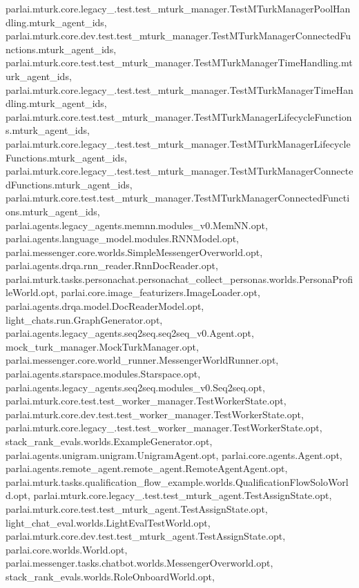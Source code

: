 parlai.\+mturk.\+core.\+legacy\+\_.\+test.\+test\+\_\+mturk\+\_\+manager.\+Test\+M\+Turk\+Manager\+Pool\+Handling.\+mturk\+\_\+agent\+\_\+ids, parlai.\+mturk.\+core.\+dev.\+test.\+test\+\_\+mturk\+\_\+manager.\+Test\+M\+Turk\+Manager\+Connected\+Functions.\+mturk\+\_\+agent\+\_\+ids, parlai.\+mturk.\+core.\+test.\+test\+\_\+mturk\+\_\+manager.\+Test\+M\+Turk\+Manager\+Time\+Handling.\+mturk\+\_\+agent\+\_\+ids, parlai.\+mturk.\+core.\+legacy\+\_.\+test.\+test\+\_\+mturk\+\_\+manager.\+Test\+M\+Turk\+Manager\+Time\+Handling.\+mturk\+\_\+agent\+\_\+ids, parlai.\+mturk.\+core.\+test.\+test\+\_\+mturk\+\_\+manager.\+Test\+M\+Turk\+Manager\+Lifecycle\+Functions.\+mturk\+\_\+agent\+\_\+ids, parlai.\+mturk.\+core.\+legacy\+\_.\+test.\+test\+\_\+mturk\+\_\+manager.\+Test\+M\+Turk\+Manager\+Lifecycle\+Functions.\+mturk\+\_\+agent\+\_\+ids, parlai.\+mturk.\+core.\+legacy\+\_.\+test.\+test\+\_\+mturk\+\_\+manager.\+Test\+M\+Turk\+Manager\+Connected\+Functions.\+mturk\+\_\+agent\+\_\+ids, parlai.\+mturk.\+core.\+test.\+test\+\_\+mturk\+\_\+manager.\+Test\+M\+Turk\+Manager\+Connected\+Functions.\+mturk\+\_\+agent\+\_\+ids, parlai.\+agents.\+legacy\+\_\+agents.\+memnn.\+modules\+\_\+v0.\+Mem\+N\+N.\+opt, parlai.\+agents.\+language\+\_\+model.\+modules.\+R\+N\+N\+Model.\+opt, parlai.\+messenger.\+core.\+worlds.\+Simple\+Messenger\+Overworld.\+opt, parlai.\+agents.\+drqa.\+rnn\+\_\+reader.\+Rnn\+Doc\+Reader.\+opt, parlai.\+mturk.\+tasks.\+personachat.\+personachat\+\_\+collect\+\_\+personas.\+worlds.\+Persona\+Profile\+World.\+opt, parlai.\+core.\+image\+\_\+featurizers.\+Image\+Loader.\+opt, parlai.\+agents.\+drqa.\+model.\+Doc\+Reader\+Model.\+opt, light\+\_\+chats.\+run.\+Graph\+Generator.\+opt, parlai.\+agents.\+legacy\+\_\+agents.\+seq2seq.\+seq2seq\+\_\+v0.\+Agent.\+opt, mock\+\_\+turk\+\_\+manager.\+Mock\+Turk\+Manager.\+opt, parlai.\+messenger.\+core.\+world\+\_\+runner.\+Messenger\+World\+Runner.\+opt, parlai.\+agents.\+starspace.\+modules.\+Starspace.\+opt, parlai.\+agents.\+legacy\+\_\+agents.\+seq2seq.\+modules\+\_\+v0.\+Seq2seq.\+opt, parlai.\+mturk.\+core.\+test.\+test\+\_\+worker\+\_\+manager.\+Test\+Worker\+State.\+opt, parlai.\+mturk.\+core.\+dev.\+test.\+test\+\_\+worker\+\_\+manager.\+Test\+Worker\+State.\+opt, parlai.\+mturk.\+core.\+legacy\+\_.\+test.\+test\+\_\+worker\+\_\+manager.\+Test\+Worker\+State.\+opt, stack\+\_\+rank\+\_\+evals.\+worlds.\+Example\+Generator.\+opt, parlai.\+agents.\+unigram.\+unigram.\+Unigram\+Agent.\+opt, parlai.\+core.\+agents.\+Agent.\+opt, parlai.\+agents.\+remote\+\_\+agent.\+remote\+\_\+agent.\+Remote\+Agent\+Agent.\+opt, parlai.\+mturk.\+tasks.\+qualification\+\_\+flow\+\_\+example.\+worlds.\+Qualification\+Flow\+Solo\+World.\+opt, parlai.\+mturk.\+core.\+legacy\+\_.\+test.\+test\+\_\+mturk\+\_\+agent.\+Test\+Assign\+State.\+opt, parlai.\+mturk.\+core.\+test.\+test\+\_\+mturk\+\_\+agent.\+Test\+Assign\+State.\+opt, light\+\_\+chat\+\_\+eval.\+worlds.\+Light\+Eval\+Test\+World.\+opt, parlai.\+mturk.\+core.\+dev.\+test.\+test\+\_\+mturk\+\_\+agent.\+Test\+Assign\+State.\+opt, parlai.\+core.\+worlds.\+World.\+opt, parlai.\+messenger.\+tasks.\+chatbot.\+worlds.\+Messenger\+Overworld.\+opt, stack\+\_\+rank\+\_\+evals.\+worlds.\+Role\+Onboard\+World.\+opt, 